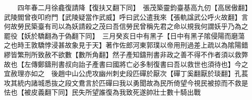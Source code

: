 　　四年春二月徐龕復請降【復扶又翻下同】　張茂築靈鈞臺基高九仞【高居傲翻】武陵閻曾夜叩府門【武陵疑當作武威】呼曰武公遣我來【張軌諡武公呼火故翻】言何故勞民築臺有司以為妖請殺之茂曰吾信勞民曾稱先君之命以規我何謂妖乎乃為之罷役【妖於驕翻為于偽翻下同】　三月癸亥日中有黑子【日中有黑子隂侵陽而磨蕩之也時王敦驕悖浸甚故象見于天】著作佐郎河東郭璞以帝用刑過差上疏以為隂陽錯繆皆繁刑所致赦不欲數【數所角翻】然子產知鑄刑書非政之善不得不作者須以救弊故也【左傳鄭鑄刑書叔向詒子產書曰國將亡必多制復書曰吾以救世也須待也】今之宜赦理亦如之　後趙中山公虎攻幽州刺史段匹磾於厭次【磾丁奚翻厭於琰翻】孔萇攻其統内諸城悉抜之段文鴦言於匹磾曰我以勇聞故為民所倚望今視民被掠而不救是怯也【被皮義翻下同】民失所望誰復為我致死遂帥壯士數十騎出戰